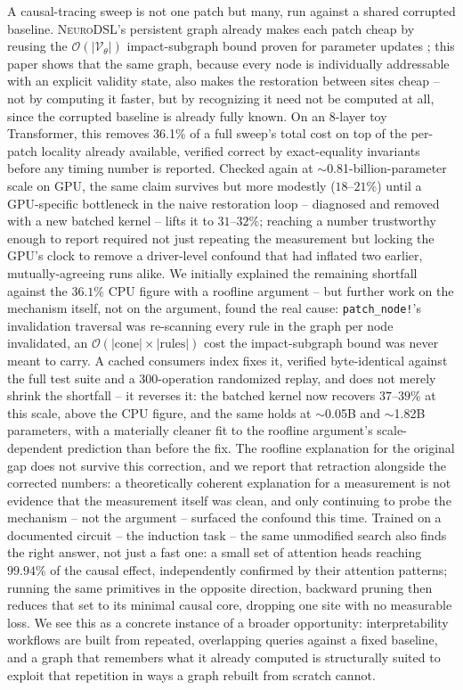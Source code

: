 \documentclass{article}
\begin{document}
A causal-tracing sweep is not one patch but many, run against a shared corrupted baseline.
\textsc{NeuroDSL}'s persistent graph already makes each patch cheap by reusing the
$\mathcal{O}(|\mathcal{V}_\theta|)$ impact-subgraph bound proven for parameter updates
\cite{neurodsl}; this paper shows that the same graph, because every node is individually
addressable with an explicit validity state, also makes the restoration between sites cheap --
not by computing it faster, but by recognizing it need not be computed at all, since the
corrupted baseline is already fully known. On an 8-layer toy Transformer, this removes 36.1\% of
a full sweep's total cost on top of the per-patch locality already available, verified correct by
exact-equality invariants before any timing number is reported. Checked again at
$\sim$0.81-billion-parameter scale on GPU, the same claim survives but more modestly ($18$--$21\%$)
until a GPU-specific bottleneck in the naive restoration loop -- diagnosed and removed with a new
batched kernel -- lifts it to $31$--$32\%$; reaching a number trustworthy enough to report required
not just repeating the measurement but locking the GPU's clock to remove a driver-level confound
that had inflated two earlier, mutually-agreeing runs alike. We initially explained the remaining
shortfall against the $36.1\%$ CPU figure with a roofline argument -- but further work on the
mechanism itself, not on the argument, found the real cause: \texttt{patch\_node!}'s invalidation
traversal was re-scanning every rule in the graph per node invalidated, an
$\mathcal{O}(|\text{cone}|\times|\text{rules}|)$ cost the impact-subgraph bound was never meant to
carry. A cached consumers index fixes it, verified byte-identical against the full test suite and a
$300$-operation randomized replay, and does not merely shrink the shortfall -- it reverses it: the
batched kernel now recovers $37$--$39\%$ at this scale, above the CPU figure, and the same holds at
$\sim$0.05B and $\sim$1.82B parameters, with a materially cleaner fit to the roofline argument's
scale-dependent prediction than before the fix. The roofline explanation for the original gap does
not survive this correction, and we report that retraction alongside the corrected numbers: a
theoretically coherent explanation for a measurement is not evidence that the measurement itself
was clean, and only continuing to probe the mechanism -- not the argument -- surfaced the
confound this time. Trained on a documented circuit --
the induction task -- the same unmodified search also finds the right answer, not just a fast one:
a small set of attention heads reaching $99.94\%$ of the causal effect, independently confirmed by
their attention patterns; running the same primitives in the opposite direction, backward pruning
then reduces that set to its minimal causal core, dropping one site with no measurable loss. We see
this as a concrete instance of
a broader opportunity: interpretability workflows are built from repeated, overlapping queries
against a fixed baseline, and a graph that remembers what it already computed is structurally
suited to exploit that repetition in ways a graph rebuilt from scratch
cannot.
\end{document}
